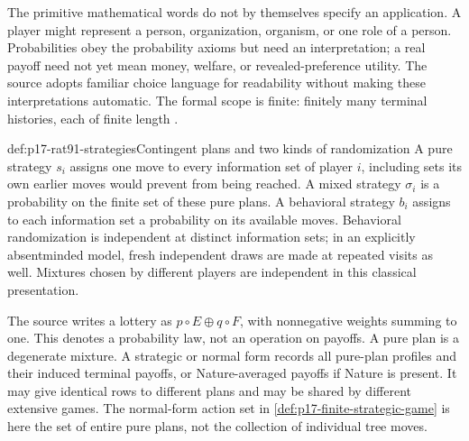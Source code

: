 The primitive mathematical words do not by themselves specify an
application. A player might represent a person, organization, organism,
or one role of a person. Probabilities obey the probability axioms but
need an interpretation; a real payoff need not yet mean money, welfare,
or revealed-preference utility. The source adopts familiar choice
language for readability without making these interpretations automatic.
The formal scope is finite: finitely many terminal histories, each of
finite length \parencite[pp.~529--530]{AlbertKliemt2021ClassicalGameTheory}.

\begin{hbdefinition}{def:p17-rat91-strategies}{Contingent plans and two kinds of randomization}
A pure strategy \(s_i\) assigns one move to every information set of
player \(i\), including sets its own earlier moves would prevent from
being reached. A mixed strategy \(\sigma_i\) is a probability on the
finite set of these pure plans. A behavioral strategy \(b_i\) assigns
to each information set a probability on its available moves.
Behavioral randomization is independent at distinct information sets;
in an explicitly absentminded model, fresh independent draws are made
at repeated visits as well. Mixtures chosen by different players are
independent in this classical presentation.

The source writes a lottery as \(p\circ E\oplus q\circ F\), with
nonnegative weights summing to one. This denotes a probability law,
not an operation on payoffs. A pure plan is a degenerate mixture.
A strategic or normal form records all pure-plan profiles and their
induced terminal payoffs, or Nature-averaged payoffs if Nature is present.
It may give identical rows to different plans and may be shared by
different extensive games. The normal-form action set in
\cref{def:p17-finite-strategic-game} is here the set of entire pure plans,
not the collection of individual tree moves.
\end{hbdefinition}

